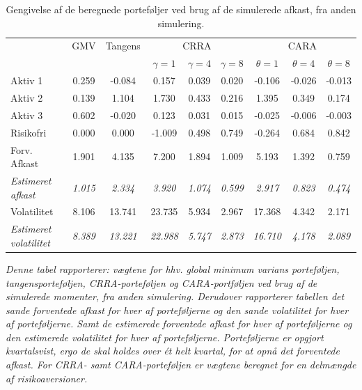 \documentclass[
  a4paper,
  oneside]{memoir}
\begin{document}
\begin{table}[H]

\caption{\label{tab:sum-2}Gengivelse af de beregnede porteføljer ved brug af de simulerede afkast, fra anden simulering.}
\centering
\begin{threeparttable}
\begin{tabular}[t]{lcccccccc}
\toprule
\multicolumn{1}{c}{ } & \multicolumn{1}{c}{GMV} & \multicolumn{1}{c}{Tangens} & \multicolumn{3}{c}{CRRA} & \multicolumn{3}{c}{CARA} \\
\cmidrule(l{3pt}r{3pt}){2-2} \cmidrule(l{3pt}r{3pt}){3-3} \cmidrule(l{3pt}r{3pt}){4-6} \cmidrule(l{3pt}r{3pt}){7-9}
  &   &   & $\gamma=1$ & $\gamma=4$ & $\gamma=8$ & $\theta=1$ & $\theta=4$ & $\theta=8$\\
\midrule
\rowcolor{gray!6}  Aktiv 1 & 0.259 & -0.084 & 0.157 & 0.039 & 0.020 & -0.106 & -0.026 & -0.013\\
Aktiv 2 & 0.139 & 1.104 & 1.730 & 0.433 & 0.216 & 1.395 & 0.349 & 0.174\\
\rowcolor{gray!6}  Aktiv 3 & 0.602 & -0.020 & 0.123 & 0.031 & 0.015 & -0.025 & -0.006 & -0.003\\
Risikofri & 0.000 & 0.000 & -1.009 & 0.498 & 0.749 & -0.264 & 0.684 & 0.842\\
\rowcolor{gray!6}  Forv. Afkast & 1.901 & 4.135 & 7.200 & 1.894 & 1.009 & 5.193 & 1.392 & 0.759\\
\em{Estimeret afkast} & \em{1.015} & \em{2.334} & \em{3.920} & \em{1.074} & \em{0.599} & \em{2.917} & \em{0.823} & \em{0.474}\\
\rowcolor{gray!6}  Volatilitet & 8.106 & 13.741 & 23.735 & 5.934 & 2.967 & 17.368 & 4.342 & 2.171\\
\em{Estimeret volatilitet} & \em{8.389} & \em{13.221} & \em{22.988} & \em{5.747} & \em{2.873} & \em{16.710} & \em{4.178} & \em{2.089}\\
\bottomrule
\end{tabular}
\begin{tablenotes}
\item \textit{Denne tabel rapporterer: vægtene for hhv. global minimum varians porteføljen, tangensporteføljen, CRRA-porteføljen og CARA-portføljen ved brug af de simulerede momenter, fra anden simulering. Derudover rapporterer tabellen det sande forventede afkast for hver af porteføljerne og den sande volatilitet for hver af porteføljerne.  Samt de estimerede forventede afkast for hver af porteføljerne og den estimerede volatilitet for hver af porteføljerne. Porteføljerne er opgjort kvartalsvist, ergo de skal holdes over ét helt kvartal, for at opnå det forventede afkast. For CRRA- samt CARA-porteføljen er vægtene beregnet for en delmængde af risikoaversioner.}
\end{tablenotes}
\end{threeparttable}
\end{table}
\end{document}
